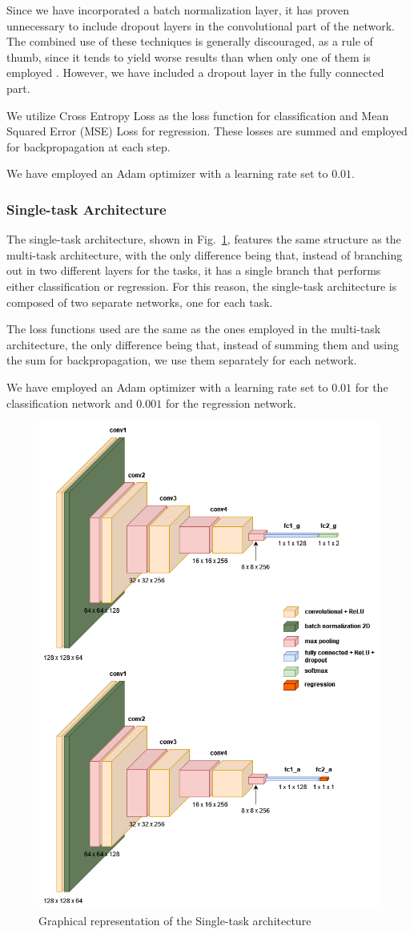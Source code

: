 Since we have incorporated a batch normalization layer,
it has proven unnecessary to include dropout layers in the convolutional part
of the network.
The combined use of these techniques is generally discouraged,
as a rule of thumb, since it tends to yield worse results than
when only one of them is employed \cite{app3}.
However, we have included a dropout layer in the fully connected part.

We utilize Cross Entropy Loss as the loss function for classification
and Mean Squared Error (MSE) Loss for regression.
These losses are summed and employed for backpropagation at each step.

We have employed an Adam optimizer with a learning rate set to $0.01$.

\subsubsection{Single-task Architecture} \label{sec:single}

The single-task architecture, shown in Fig.~\ref{cnn2},
features the same structure as the multi-task architecture,
with the only difference being that, instead of branching out
in two different layers for the tasks, it has a single branch
that performs either classification or regression.
For this reason, the single-task architecture is composed of
two separate networks, one for each task.

The loss functions used are the same as the ones employed
in the multi-task architecture, the only difference being
that, instead of summing them and using the sum for backpropagation,
we use them separately for each network.

We have employed an Adam optimizer with a learning rate set to $0.01$
for the classification network and $0.001$ for the regression network.\\

\begin{figure}[htbp]
    \centerline{\includegraphics[width=.5\textwidth]{images/single_cnn.png}}
    \caption{Graphical representation of the Single-task architecture}
    \label{cnn2}
\end{figure}

